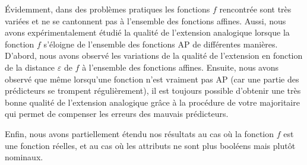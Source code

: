 Évidemment, dans des problèmes pratiques les fonctions $f$ rencontrée sont très
variées et ne se cantonnent pas à l'ensemble des fonctions affines. Aussi,
nous avons expérimentalement étudié la qualité de l'extension analogique
lorsque la fonction $f$ s'éloigne de l'ensemble des fonctions AP de différentes
manières. D'abord, nous avons observé les variations de la qualité de
l'extension en fonction de la distance $\varepsilon$ de $f$ à l'ensemble des
fonctions affines. Ensuite, nous avons observé que même lorsqu'une fonction
n'est vraiment pas AP (car une partie des prédicteurs se trompent
régulièrement), il est toujours possible d'obtenir une très bonne qualité de
l'extension analogique grâce à la procédure de votre majoritaire qui permet de
compenser les erreurs des mauvais prédicteurs.

Enfin, nous avons partiellement étendu nos résultats au cas où la fonction $f$
est une fonction réelles, et au cas où les attributs ne sont plus booléens mais
plutôt nominaux.
